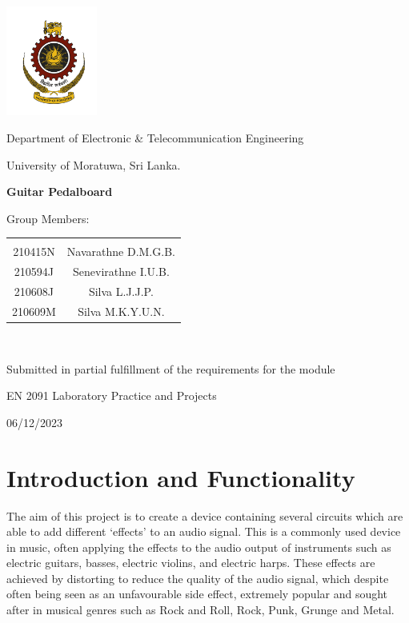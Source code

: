\documentclass{article}
\begin{document}
	
	\begin{titlepage}
		
		\centering
		\vspace*{0.5cm}
		\includegraphics[width=3cm]{logo.png} %
		\par\vspace{0.02cm}
		Department of Electronic \& Telecommunication Engineering
  
            University of Moratuwa, Sri Lanka.
		\par\vspace{2cm}
		{\LARGE\bfseries Guitar Pedalboard\par}
		\vspace{7cm}
		{\large Group Members:\par}
		\begin{tabular}{c c}
			& \\
            210415N	&	Navarathne D.M.G.B.\\
            210594J &	Senevirathne I.U.B.\\
            210608J &	Silva L.J.J.P.\\
            210609M	&	Silva M.K.Y.U.N. \\
		\end{tabular}\\
		\vspace{1.5cm}
		{Submitted in partial fulfillment of the requirements for the module\par}
		{EN 2091 Laboratory Practice and Projects\par}
	
		\vspace{1.0cm}
		{\large 06/12/2023\par}
		\vfill
	\end{titlepage}
	
	\newpage
	
	\tableofcontents
	\newpage
        
	
	\section{Introduction and Functionality}
            The aim of this project is to create a device containing several circuits which are able to add different ‘effects’ to an audio signal. This is a commonly used device in music, often applying the effects to the audio output of instruments such as electric guitars, basses, electric violins, and electric harps. These effects are achieved by distorting to reduce the quality of the audio signal, which despite often being seen as an unfavourable side effect, extremely popular and sought after in musical genres such as Rock and Roll, Rock, Punk, Grunge and Metal.\\
            
\end{document}
